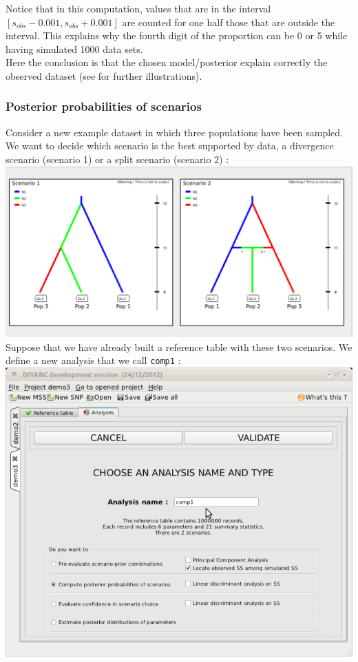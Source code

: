 Notice that in this computation, values that are in the interval $[s_{obs}-0.001,s_{obs}+0.001]$ are counted for one half those that are outside the interval. This explains why the fourth digit of the proportion can be 0 or 5 while having simulated 1000 data sets.\\
Here the conclusion is that the chosen model/posterior explain correctly the observed dataset (see \cite{C2010} for further illustrations). 

\subsubsection{Posterior probabilities of scenarios}
Consider a new example dataset in which three populations have been sampled. We want to decide which scenario is the best supported by data, a divergence scenario (scenario 1) or a split scenario (scenario 2) :\\

\includegraphics[scale=0.33]{gui_pictures/Capture-DIYABC-113.png} \\

Suppose that we have already built a reference table with these two scenarios. We define a new analysis that we call \texttt{comp1} :\\

\includegraphics[scale=0.33]{gui_pictures/Capture-DIYABC-105.png} \\
 
